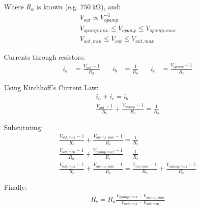 \documentclass[landscape,twocolumn]{article}
\begin{document}
\begin{center}
\end{center}

\newpage

Where $R_a$ is known (e.g. $\SI{750}{\kilo\ohm}$), and:
\begin{gather*}
    V_{out} \propto V_{opamp}^{-1} \\
    V_{opamp,min}\le V_{opamp}\le V_{opamp,max} \\
    V_{out,min}\le V_{out}\le V_{out,max}
\end{gather*}

Currents through resistors:
\begin{align*}
    i_a & = \frac{V_{out} - 1}{R_a} \quad & i_b & = \frac{1}{R_b} \quad & i_c & = \frac{V_{opamp} - 1}{R_c}
\end{align*}

Using Kirchhoff's Current Law:
\begin{gather*}
    i_a + i_c = i_b \\
    \frac{V_{out} - 1}{R_a} + \frac{V_{opamp} - 1}{R_c} = \frac{1}{R_b}
\end{gather*}

Substituting:
\begin{gather*}
    \frac{V_{out,max} - 1}{R_a} + \frac{V_{opamp,min} - 1}{R_c} = \frac{1}{R_b} \\
    \frac{V_{out,min} - 1}{R_a} + \frac{V_{opamp,max} - 1}{R_c} = \frac{1}{R_b} \\
    \frac{V_{out,max} - 1}{R_a} + \frac{V_{opamp,min} - 1}{R_c} = \frac{V_{out,min} - 1}{R_a} + \frac{V_{opamp,max} - 1}{R_c}
\end{gather*}

Finally:
\begin{gather*}
    R_c = R_a\frac{V_{opamp,max} - V_{opamp,min}}{V_{out,max} - V_{out,min}}
\end{gather*}
\end{document}
